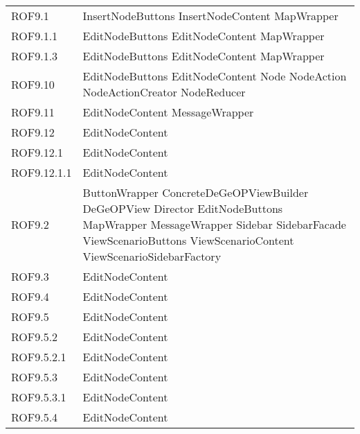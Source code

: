 \begin{longtable}{p{2.5cm}!{\VRule[1pt]}p{5cm}}
		ROF9.1 & InsertNodeButtons \newline InsertNodeContent \newline MapWrapper\\
		ROF9.1.1 & EditNodeButtons \newline EditNodeContent \newline MapWrapper\\
		ROF9.1.3 & EditNodeButtons \newline EditNodeContent \newline MapWrapper\\
		ROF9.10 & EditNodeButtons \newline EditNodeContent \newline Node \newline NodeAction \newline NodeActionCreator \newline NodeReducer\\
		ROF9.11 & EditNodeContent \newline MessageWrapper\\
		ROF9.12 & EditNodeContent\\
		ROF9.12.1 & EditNodeContent\\
		ROF9.12.1.1 & EditNodeContent\\
		ROF9.2 & ButtonWrapper \newline ConcreteDeGeOPViewBuilder \newline DeGeOPView \newline Director \newline EditNodeButtons \newline MapWrapper \newline MessageWrapper \newline Sidebar \newline SidebarFacade \newline ViewScenarioButtons \newline ViewScenarioContent \newline ViewScenarioSidebarFactory\\
		ROF9.3 & EditNodeContent\\
		ROF9.4 & EditNodeContent\\
		ROF9.5 & EditNodeContent\\
		ROF9.5.2 & EditNodeContent\\
		ROF9.5.2.1 & EditNodeContent\\
		ROF9.5.3 & EditNodeContent\\
		ROF9.5.3.1 & EditNodeContent\\
		ROF9.5.4 & EditNodeContent\\

\end{longtable}
